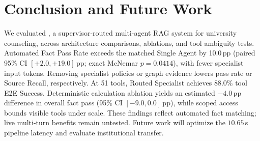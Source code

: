 \section{Conclusion and Future Work}
\label{sec:conclusion}

We evaluated \system{}, a supervisor-routed multi-agent RAG system for university counseling, across architecture comparisons, ablations, and tool ambiguity tests. Automated Fact Pass Rate exceeds the matched Single Agent by 10.0\,pp (paired 95\% CI $[+2.0, +19.0]$\,pp; exact McNemar $p{=}0.0414$), with fewer specialist input tokens. Removing specialist policies or graph evidence lowers pass rate or Source Recall, respectively. At 51 tools, Routed Specialist achieves 88.0\% tool E2E Success. Deterministic calculation ablation yields an estimated $-4.0$\,pp difference in overall fact pass (95\% CI $[-9.0, 0.0]$\,pp), while scoped access bounds visible tools under scale. These findings reflect automated fact matching; live multi-turn benefits remain untested. Future work will optimize the $10.65$\,s pipeline latency and evaluate institutional transfer.
